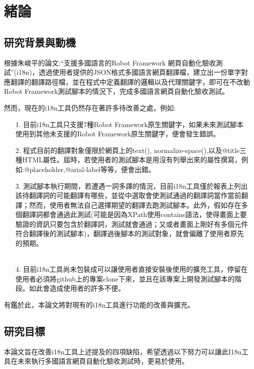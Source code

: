 \chapter{緒論}

\section{研究背景與動機}
根據朱峻平的論文:“支援多國語言的Robot Framework 網頁自動化驗收測試”(i18n)\cite{i18n}，透過使用者提供的JSON格式\cite{json}多國語言網頁翻譯檔，建立出一份單字對應翻譯的翻譯路徑檔，並在程式中定義翻譯的邏輯以及代理關鍵字，即可在不改動Robot Framework測試腳本的情況下，完成多國語言網頁自動化驗收測試。

然而，現在的i18n\cite{internationalization}工具仍然存在著許多待改善之處，例如: 

\begin{itemize}
\item[1.] 目前i18n工具只支援7種Robot Framework\cite{rf}原生關鍵字，如果未來測試腳本使用到其他未支援的Robot Framework原生關鍵字，便會發生錯誤。
\item[2.] 程式目前的翻譯對象僅限於網頁上的text(), normalize-space(),以及@title三種HTML屬性。屆時，若使用者的測試腳本是用沒有列舉出來的屬性撰寫，例如:@placeholder,@arial-label等等，便會出錯。
\item[3.] 測試腳本執行期間，若遭遇一詞多譯的情況，目前i18n工具僅於報表上列出該待翻譯詞的可能翻譯有哪些，並從中選取會使測試通過的翻譯詞當作當前翻譯；然而，使用者無法自己選擇期望的翻譯去跑測試腳本。此外，假如存在多個翻譯詞都會通過此測試(可能是因為XPath\cite{xpath}\cite{stablexpath}使用contains語法，使得畫面上要驗證的資訊只要包含於翻譯詞，測試就會通過；又或者畫面上剛好有多個元件符合翻譯後的測試腳本)，翻譯過後腳本的測試對象，就會偏離了使用者原先的預期。
\\ \hspace*{\fill} \\ 
\item[4.] 目前i18n工具尚未包裝成可以讓使用者直接安裝後使用的擴充工具，停留在使用者必須將github上的專案clone下來，並且在該專案上開發測試腳本的階段。如此會造成使用者的許多不便。
\end{itemize}

有鑑於此，本論文將對現有的i18n工具進行功能的改善與擴充。

\section{研究目標}
本論文旨在改善i18n工具上述提及的四項缺陷，希望透過以下努力可以讓此I18n工具在未來執行多國語言網頁自動化驗收測試\cite{se}\cite{testduo}時，更易於使用。

